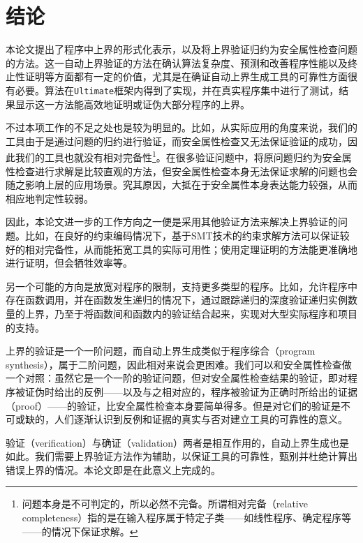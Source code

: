 
\chapter{结论}

本论文提出了程序中上界的形式化表示，以及将上界验证归约为安全属性检查问题的方法。这一自动上界验证的方法在确认算法复杂度、预测和改善程序性能以及终止性证明等方面都有一定的价值，尤其是在确证自动上界生成工具的可靠性方面很有必要。算法在\texttt{Ultimate}框架内得到了实现，并在真实程序集中进行了测试，结果显示这一方法能高效地证明或证伪大部分程序的上界。

不过本项工作的不足之处也是较为明显的。比如，从实际应用的角度来说，我们的工具由于是通过问题的归约进行验证，而安全属性检查又无法保证验证的成功，因此我们的工具也就没有相对完备性\footnote{问题本身是不可判定的，所以必然不完备。所谓相对完备（relative completeness）指的是在输入程序属于特定子类——如线性程序、确定程序等——的情况下保证求解。}。在很多验证问题中，将原问题归约为安全属性检查进行求解是比较直观的方法，但安全属性检查本身无法保证求解的问题也会随之影响上层的应用场景。究其原因，大抵在于安全属性本身表达能力较强，从而相应地判定性较弱。

因此，本论文进一步的工作方向之一便是采用其他验证方法来解决上界验证的问题。比如，在良好的约束编码情况下，基于SMT技术\cite{de_moura_satisfiability_2011}的约束求解方法可以保证较好的相对完备性，从而能拓宽工具的实际可用性；使用定理证明的方法能更准确地进行证明，但会牺牲效率等。

另一个可能的方向是放宽对程序的限制，支持更多类型的程序。比如，允许程序中存在函数调用，并在函数发生递归的情况下，通过跟踪递归的深度验证递归实例数量的上界，乃至于将函数间和函数内的验证结合起来，实现对大型实际程序和项目的支持。

上界的验证是一个一阶问题，而自动上界生成类似于程序综合（program synthesis\cite{gulwani_program_2017}），属于二阶问题，因此相对来说会更困难。我们可以和安全属性检查做一个对照：虽然它是一个一阶的验证问题，但对安全属性检查结果的验证，即对程序被证伪时给出的反例——以及与之相对应的，程序被验证为正确时所给出的证据（proof）——的验证，比安全属性检查本身要简单得多。但是对它们的验证是不可或缺的，人们逐渐认识到反例和证据的真实与否对建立工具的可靠性的意义。

验证（verification）与确证（validation）两者是相互作用的，自动上界生成也是如此。我们需要上界验证方法作为辅助，以保证工具的可靠性，甄别并杜绝计算出错误上界的情况。本论文即是在此意义上完成的。